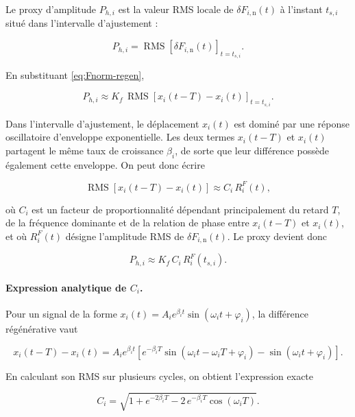 \documentclass[11pt,a4paper]{article}
\newcommand{\dFin}{\delta F_{i,\mathrm{n}}}    %
\newcommand{\betai}{\beta_i}                   %
\newcommand{\Pproxy}{P_{h,i}}                  %
\newcommand{\RMS}{\operatorname{RMS}}
\begin{document}
Le proxy d'amplitude \(\Pproxy\) est la valeur RMS locale de \(\dFin(t)\) à
l'instant \(t_{s,i}\) situé dans l'intervalle d'ajustement :

\begin{equation}
    \Pproxy = \RMS\!\left[\dFin(t)\right]_{t=t_{s,i}}.
    \label{eq:proxy-def}
\end{equation}

En substituant \ref{eq:Fnorm-regen},

\begin{equation}
    \Pproxy \approx K_f\,\RMS\!\left[x_i(t-T)-x_i(t)\right]_{t=t_{s,i}}.
    \label{eq:proxy-regen}
\end{equation}

Dans l'intervalle d'ajustement, le déplacement \(x_i(t)\) est dominé par une
réponse oscillatoire d'enveloppe exponentielle. Les deux termes \(x_i(t-T)\) et
\(x_i(t)\) partagent le même taux de croissance \(\betai\), de sorte que leur
différence possède également cette enveloppe. On peut donc écrire

\begin{equation}
    \RMS\!\left[x_i(t-T)-x_i(t)\right] \approx C_i\,R_i^F(t),
    \label{eq:proxy-Ci}
\end{equation}

où \(C_i\) est un facteur de proportionnalité dépendant principalement du retard
\(T\), de la fréquence dominante et de la relation de phase entre \(x_i(t-T)\)
et \(x_i(t)\), et où \(R_i^F(t)\) désigne l'amplitude RMS de \(\dFin(t)\). Le proxy
devient donc

\begin{equation}
    \Pproxy \approx K_f\,C_i\,R_i^F(t_{s,i}).
    \label{eq:proxy-approx}
\end{equation}

\paragraph{Expression analytique de \(C_i\).}
Pour un signal de la forme \(x_i(t)=A_i e^{\betai t}\sin(\omega_i t+\varphi_i)\),
la différence régénérative vaut

\[
    x_i(t-T)-x_i(t)
    =A_i e^{\betai t}\!\left[e^{-\betai T}\sin(\omega_i t-\omega_i T+\varphi_i)
    -\sin(\omega_i t+\varphi_i)\right].
\]

En calculant son RMS sur plusieurs cycles, on obtient l'expression exacte

\begin{equation}
    C_i = \sqrt{1 + e^{-2\betai T} - 2\,e^{-\betai T}\cos(\omega_i T)}.
    \label{eq:Ci-exact}
\end{equation}
\end{document}
